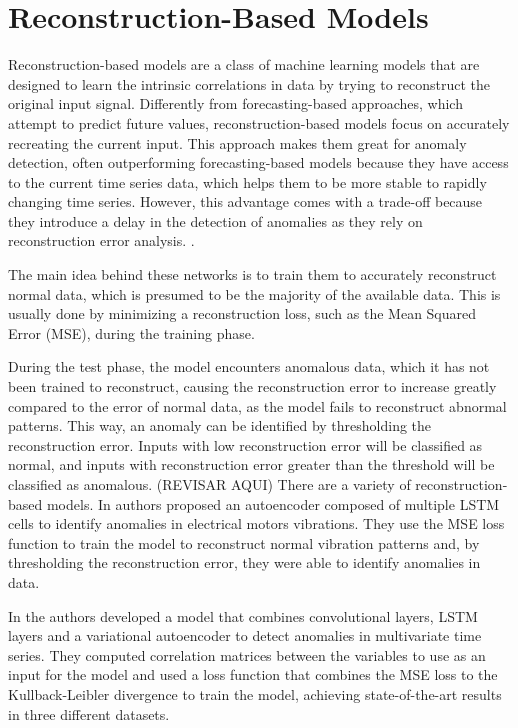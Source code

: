 \section{Reconstruction-Based Models}

Reconstruction-based models are a class of machine learning models that are designed to learn the intrinsic correlations in data by trying to reconstruct the original input signal. Differently from forecasting-based approaches, which attempt to predict future values, reconstruction-based models focus on accurately recreating the current input. This approach makes them great for anomaly detection, often outperforming forecasting-based models because they have access to the current time series data, which helps them to be more stable to rapidly changing time series. However, this advantage comes with a trade-off because they introduce a delay in the detection of anomalies as they rely on reconstruction error analysis. \cite{Zamanzadeh_Darban_Webb_Pan_Aggarwal_Salehi_2024}. 

The main idea behind these networks is to train them to accurately reconstruct normal data, which is presumed to be the majority of the available data. This is usually done by minimizing a reconstruction loss, such as the Mean Squared Error (MSE), during the training phase. 

During the test phase, the model encounters anomalous data, which it has not been trained to reconstruct, causing the reconstruction error to increase greatly compared to the error of normal data, as the model fails to reconstruct abnormal patterns. This way, an anomaly can be identified by thresholding the reconstruction error. Inputs with low reconstruction error will be classified as normal, and inputs with reconstruction error greater than the threshold will be classified as anomalous.
(REVISAR AQUI)
There are a variety of reconstruction-based models. In \cite{en17102340} authors proposed an autoencoder composed of multiple LSTM cells to identify anomalies in electrical motors vibrations. They use the MSE loss function to train the model to reconstruct normal vibration patterns and, by thresholding the reconstruction error, they were able to identify anomalies in data.

In \cite{XIE2023120725} the authors developed a model that combines convolutional layers, LSTM layers and a variational autoencoder to detect anomalies in multivariate time series. They computed correlation matrices between the variables to use as an input for the model and used a loss function that combines the MSE loss to the Kullback-Leibler divergence to train the model, achieving state-of-the-art results in three different datasets.

